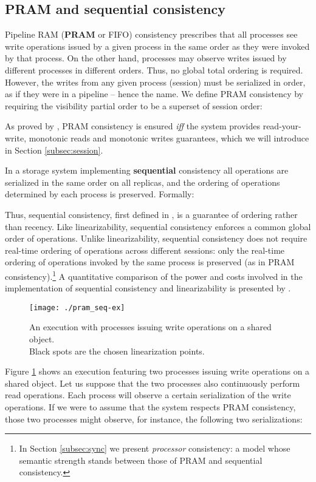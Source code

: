 \documentclass[letter, 11pt]{article}
\newcommand{\citeN}{\citet}
\renewcommand{\cite}{\citep}
\begin{document}
\subsection{PRAM and sequential consistency}
\label{subsec:pram-seq}
Pipeline RAM (\textbf{PRAM} or FIFO) consistency  \cite{Lipton.Sandberg:88} prescribes that
all processes see write operations issued by a given process in the same order as they were invoked by that process.
On the other hand, processes may observe writes issued by different processes in different orders. 
Thus, no global total ordering is required. 
However, the writes from any given process (session) must be serialized in order, 
as if they were in a pipeline -- hence the name. 
We define PRAM consistency by requiring the visibility partial order to be a superset of session order: 

As proved by \citeN{Brzezinski.Sobaniec.ea:03}, PRAM consistency is ensured \emph{iff} 
the system provides read-your-write, monotonic reads and monotonic writes guarantees,
which we will introduce in Section \ref{subsec:session}.



In a storage system implementing \textbf{sequential} consistency all operations are serialized 
in the same order on all replicas, and the ordering of operations determined by each process is preserved.
Formally:

Thus, sequential consistency, first defined in \cite{Lamport:79}, is a guarantee of 
ordering rather than recency. Like linearizability, sequential consistency enforces a common global order of operations.
Unlike linearizability, sequential consistency 
does not require real-time ordering of operations across different sessions: only the real-time 
ordering of operations invoked by the same process is preserved 
(as in PRAM consistency).\footnote{In Section \ref{subsec:sync} we present \emph{processor} consistency: 
a model whose semantic strength stands between those of PRAM and sequential consistency.}
A quantitative comparison of the power and costs involved 
in the implementation of sequential consistency and linearizability is presented by \citeN{Attiya:Welch:94}.

\begin{figure}[h]
	\centering
	\texttt{[image: ./pram\_seq-ex]} 	\caption{An execution with processes issuing write operations on a shared object.\\
	Black spots are the chosen linearization points.}
	\label{fig:pram_seq-ex}
\end{figure}
Figure \ref{fig:pram_seq-ex} shows an execution featuring two processes issuing 
write operations on a shared object.
Let us suppose that the two processes also continuously perform read operations. Each process will observe a certain serialization of the write operations.
If we were to assume that the system respects PRAM consistency, those two processes might observe, for instance, 
the following two serializations:
\end{document}
